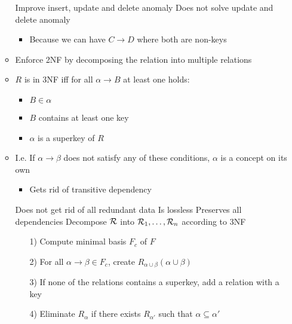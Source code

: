 \begin{itemize}
\begin{itemize}
\begin{itemize}
                \end{itemize}
            \ipro Improve insert, update and delete anomaly
            \icon Does not solve update and delete anomaly
                \begin{itemize}
                    \item Because we can have $C \to D$ where both are non-keys
                \end{itemize}
            \item Enforce 2NF by decomposing the relation into multiple relations
        \end{itemize}
        \begin{itemize}
            \item $R$ is in 3NF iff for all $\alpha \to B$ at least one holds:
                \begin{itemize}
                    \item $B \in \alpha$
                    \item $B$ contains at least one key
                    \item $\alpha$ is a superkey of $R$
                \end{itemize}
            \item I.e. If $\alpha \to \beta$ does not satisfy any of these conditions, $\alpha$ is a concept on its own
                \begin{itemize}
                    \item Gets rid of transitive dependency
                \end{itemize}
            \icon Does not get rid of all redundant data
            \ipro Is lossless
            \ipro Preserves all dependencies
             Decompose $\mathcal{R}$ into $\mathcal{R}_1, \dots, \mathcal{R}_n$ according to 3NF
                \begin{itemize}
                    \item[1)] Compute minimal basis $F_c$ of $F$
                    \item[2)] For all $\alpha \to \beta \in F_c$, create $R_{\alpha \cup \beta}(\alpha \cup \beta)$
                    \item[3)] If none of the relations contains a superkey, add a relation with a key
                    \item[4)] Eliminate $R_\alpha$ if there exists $R_{\alpha'}$ such that $\alpha \subseteq \alpha'$
                \end{itemize}

\end{itemize}
\end{itemize}
